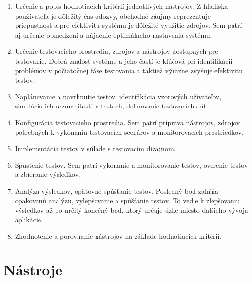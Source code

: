\documentclass[12pt,oneside,final]{fithesis-utf8}
\begin{document}
\begin{enumerate}

\item Určenie a popis hodnotiacich kritérií jednotlivých nástrojov. Z hľadiska používateľa je dôležitý čas odozvy, obchodné záujmy reprezentuje priepustnosť a pre efektivitu systému je dôležité využitie zdrojov. Sem patrí aj určenie obmedzení a nájdenie optimálneho nastavenia systému.

\item Určenie testovacieho prostredia, zdrojov a nástrojov dostupných pre testovanie. Dobrá znalosť systému a jeho častí je kľúčová pri identifikácii problémov v počiatočnej fáze testovania a taktiež výrazne zvyšuje efektivitu testov. %

\item Naplánovanie a navrhnutie testov, identifikácia vzorových užívateľov, simulácia ich rozmanitosti v testoch, definovanie testovacích dát.

\item Konfigurácia testovacieho prostredia. Sem patrí príprava nástrojov, zdrojov potrebných k vykonaniu testovacích scenárov a monitorovacích prostriedkov.

\item Implementácia testov v súlade s testovacím dizajnom.

\item Spustenie testov. Sem patrí vykonanie a monitorovanie testov, overenie testov a zbieranie výsledkov.

\item Analýza výsledkov, opätovné spúšťanie testov. Posledný bod zahŕňa opakovanú analýzu, vylepšovanie a spúšťanie testov. To vedie k zlepšovaniu výsledkov až po určitý konečný bod, ktorý určuje úzke miesto ďalšieho vývoja aplikácie.

\item Zhodnotenie a porovnanie nástrojov na základe hodnotiacich kritérií.

\end{enumerate}

\chapter{Nástroje}
\end{document}
